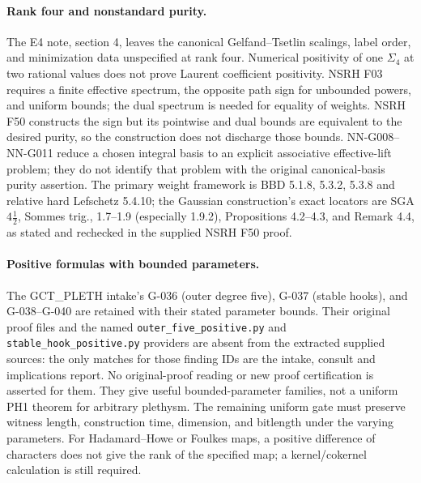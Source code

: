 \paragraph{Rank four and nonstandard purity.}
The E4 note, section 4, leaves the canonical
Gelfand--Tsetlin scalings, label order, and minimization
data unspecified at rank four. Numerical positivity
of one $\Sigma_4$ at two rational values does not
prove Laurent coefficient positivity. NSRH F03
requires a finite effective spectrum, the opposite
path sign for unbounded powers, and uniform bounds;
the dual spectrum is needed for equality of weights.
NSRH F50 constructs the sign but its pointwise and
dual bounds are equivalent to the desired purity,
so the construction does not discharge those bounds.
NN-G008--NN-G011 reduce a chosen integral basis to
an explicit associative effective-lift problem;
they do not identify that problem with the original
canonical-basis purity assertion. The primary weight
framework is BBD 5.1.8, 5.3.2, 5.3.8 and relative
hard Lefschetz 5.4.10; the Gaussian construction's
exact locators are SGA $4\frac12$, Sommes trig.,
1.7--1.9 (especially 1.9.2), Propositions 4.2--4.3,
and Remark 4.4, as stated and rechecked in the
supplied NSRH F50 proof.

\paragraph{Positive formulas with bounded parameters.}
The GCT\_PLETH intake's G-036 (outer degree five),
G-037 (stable hooks), and G-038--G-040 are retained
with their stated parameter bounds. Their original
proof files and the named \texttt{outer\_five\_positive.py}
and \texttt{stable\_hook\_positive.py} providers are absent
from the extracted supplied sources: the only matches
for those finding IDs are the intake, consult and
implications report. No original-proof reading or new
proof certification is asserted for them.
They give useful bounded-parameter families, not a
uniform PH1 theorem for arbitrary plethysm. The
remaining uniform gate must preserve witness
length, construction time, dimension, and bitlength
under the varying parameters. For Hadamard--Howe
or Foulkes maps, a positive difference of characters
does not give the rank of the specified map; a
kernel/cokernel calculation is still required.
